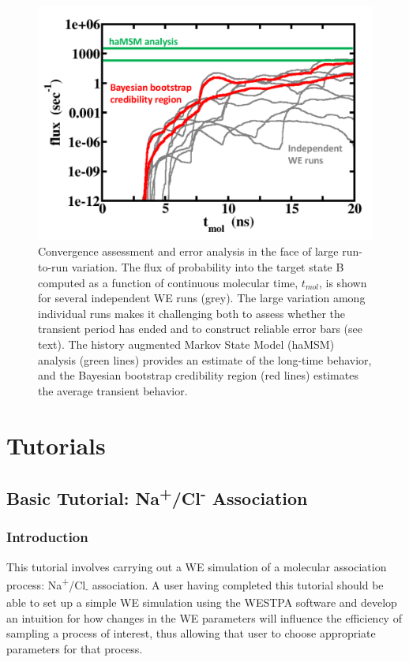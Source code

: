 \documentclass[9pt,tutorial]{livecoms}
\begin{document}
\begin{figure}
\includegraphics[width=\linewidth]{Figure3.png}
\caption{Convergence assessment and error analysis in the face of large run-to-run variation. 
The flux of probability into the target state B computed as a function of continuous molecular time, $t_{mol}$, is shown for several independent WE runs (grey). 
The large variation among individual runs makes it challenging both to assess whether the transient period has ended and to construct reliable error bars (see text). 
The history augmented Markov State Model (haMSM) analysis (green lines) provides an estimate of the long-time behavior, and the Bayesian bootstrap credibility region (red lines) estimates the average transient behavior.}
\label{fig:view}
\end{figure}

\section{Tutorials}

\subsection{Basic Tutorial: Na\textsuperscript{+}/Cl\textsuperscript{-} Association}

\subsubsection{Introduction}

This tutorial involves carrying out a WE simulation of a molecular association process: Na\textsuperscript{+}/Cl\textsubscript{-} association. 
A user having completed this tutorial should be able to set up a simple WE simulation using the WESTPA software and develop an intuition for how changes in the WE parameters will influence the efficiency of sampling a process of interest, thus allowing that user to choose appropriate parameters for that process.
\end{document}
